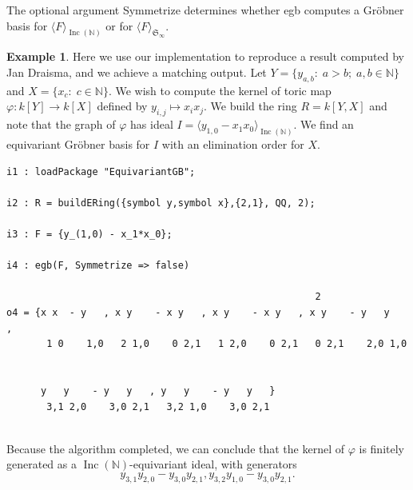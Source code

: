\documentclass{amsart}
\theoremstyle{definition}
\newtheorem{example}[theorem]{Example}
\theoremstyle{remark}
\numberwithin{equation}{section}
\newenvironment{Macaulay2}{ \begin{spacing}{0.4} %
\smallskip } { \smallskip %
\end{spacing} }
\newcommand{\B}[1]{\mathbb #1}
\newcommand{\F}[1]{\mathfrak #1}
\newcommand{\<}{\langle}
\renewcommand{\>}{\rangle}
\newcommand{\ideal}[1]{\langle #1 \rangle}
\newcommand{\Inc}{\operatorname{Inc}(\B N)}
\begin{document}
The optional argument {\ttfamily Symmetrize} determines whether {\ttfamily egb} computes a Gr\"obner basis for $\ideal{F}_{\Inc}$ or for $\ideal{F}_{\F S_\infty}$.

\begin{example}
Here we use our implementation to reproduce a result computed by Jan Draisma, and we achieve a matching output.  Let $Y = \{y_{a,b}:\; a > b;\; a,b \in \B N\}$ and $X = \{x_c:\; c \in \B N\}$.  We wish to compute the kernel of toric map $\varphi:k[Y] \to k[X]$ defined by $y_{i,j} \mapsto x_ix_j$.  We build the ring $R = k[Y,X]$ and note that the graph of $\varphi$ has ideal $I = \ideal{y_{1,0} - x_1x_0}_{\Inc}$.  We find an equivariant Gr\"obner basis for $I$ with an elimination order for $X$.
 \begin{Macaulay2}
\begin{verbatim}
i1 : loadPackage "EquivariantGB";

i2 : R = buildERing({symbol y,symbol x},{2,1}, QQ, 2);

i3 : F = {y_(1,0) - x_1*x_0};

i4 : egb(F, Symmetrize => false)

                                                      2
o4 = {x x  - y   , x y    - x y   , x y    - x y   , x y    - y   y   ,
       1 0    1,0   2 1,0    0 2,1   1 2,0    0 2,1   0 2,1    2,0 1,0 
       
       
      y   y    - y   y   , y   y    - y   y   }
       3,1 2,0    3,0 2,1   3,2 1,0    3,0 2,1
       
\end{verbatim}
\end{Macaulay2}
Because the algorithm completed, we can conclude that the kernel of $\varphi$ is finitely generated as a $\Inc$-equivariant ideal, with generators 
\[ y_{3,1}y_{2,0} - y_{3,0}y_{2,1}, y_{3,2}y_{1,0} - y_{3,0}y_{2,1}. \]
\end{example}
\end{document}

